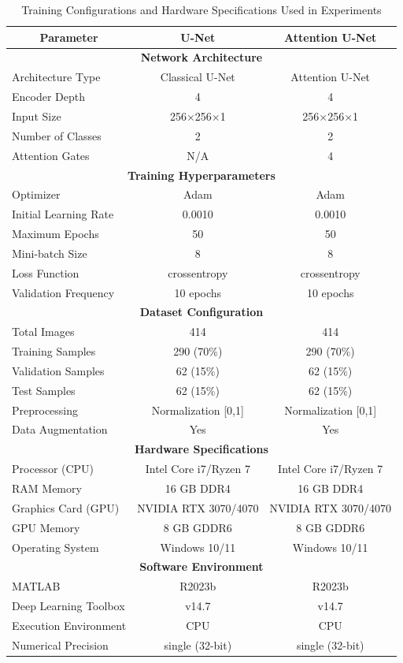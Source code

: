 \documentclass[Journal,letterpaper]{ascelike-new}
\begin{document}
\begin{table}[htbp]
\caption{Training Configurations and Hardware Specifications Used in Experiments}
\label{tab:training_configurations}
\centering
\small
\renewcommand{\arraystretch}{1.25}
\begin{tabular}{l c c}
\hline\hline
\multicolumn{1}{c}{\textbf{Parameter}} & 
\multicolumn{1}{c}{\textbf{U-Net}} & 
\multicolumn{1}{c}{\textbf{Attention U-Net}} \\
\hline
\multicolumn{3}{c}{\textbf{Network Architecture}} \\
\hline
Architecture Type & Classical U-Net & Attention U-Net \\
Encoder Depth & 4 & 4 \\
Input Size & 256×256×1 & 256×256×1 \\
Number of Classes & 2 & 2 \\
Attention Gates & N/A & 4 \\
\hline
\multicolumn{3}{c}{\textbf{Training Hyperparameters}} \\
\hline
Optimizer & Adam & Adam \\
Initial Learning Rate & 0.0010 & 0.0010 \\
Maximum Epochs & 50 & 50 \\
Mini-batch Size & 8 & 8 \\
Loss Function & crossentropy & crossentropy \\
Validation Frequency & 10 epochs & 10 epochs \\
\hline
\multicolumn{3}{c}{\textbf{Dataset Configuration}} \\
\hline
Total Images & 414 & 414 \\
Training Samples & 290 (70\%) & 290 (70\%) \\
Validation Samples & 62 (15\%) & 62 (15\%) \\
Test Samples & 62 (15\%) & 62 (15\%) \\
Preprocessing & Normalization [0,1] & Normalization [0,1] \\
Data Augmentation & Yes & Yes \\
\hline
\multicolumn{3}{c}{\textbf{Hardware Specifications}} \\
\hline
Processor (CPU) & Intel Core i7/Ryzen 7 & Intel Core i7/Ryzen 7 \\
RAM Memory & 16 GB DDR4 & 16 GB DDR4 \\
Graphics Card (GPU) & NVIDIA RTX 3070/4070 & NVIDIA RTX 3070/4070 \\
GPU Memory & 8 GB GDDR6 & 8 GB GDDR6 \\
Operating System & Windows 10/11 & Windows 10/11 \\
\hline
\multicolumn{3}{c}{\textbf{Software Environment}} \\
\hline
MATLAB & R2023b & R2023b \\
Deep Learning Toolbox & v14.7 & v14.7 \\
Execution Environment & CPU & CPU \\
Numerical Precision & single (32-bit) & single (32-bit) \\
\hline\hline
\end{tabular}
\normalsize
\end{table}
\end{document}
